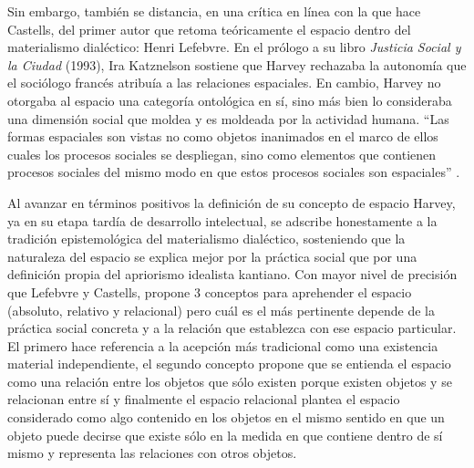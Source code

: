 Sin embargo, también se distancia, en una crítica en línea con la que hace Castells, del primer autor que retoma teóricamente el espacio dentro del materialismo dialéctico: Henri Lefebvre. En el prólogo a su libro \textit{Justicia Social y la Ciudad} (1993), Ira Katznelson sostiene que Harvey rechazaba la autonomía que el sociólogo francés atribuía a las relaciones espaciales. En cambio, Harvey no otorgaba al espacio una categoría ontológica en sí, sino más bien lo consideraba una dimensión social que moldea y es moldeada por la actividad humana. “Las formas espaciales son vistas no como objetos inanimados en el marco de ellos cuales los procesos sociales se despliegan, sino como elementos que contienen procesos sociales del mismo modo en que estos procesos sociales son espaciales” \cite[p.~3]{harvey}.

Al avanzar en términos positivos la definición de su concepto de espacio Harvey, ya en su etapa tardía de desarrollo intelectual, se adscribe honestamente a la tradición epistemológica del materialismo dialéctico, sosteniendo que la naturaleza del espacio se explica mejor por la práctica social que por una definición propia del apriorismo idealista kantiano. Con mayor nivel de precisión que Lefebvre y Castells, propone 3 conceptos para aprehender el espacio (absoluto, relativo y relacional) pero cuál es el más pertinente depende de la práctica social concreta y a la relación que establezca con ese espacio particular. El primero hace referencia a la acepción más tradicional como una existencia material independiente, el segundo concepto propone que se entienda el espacio como una relación entre los objetos que sólo existen porque existen objetos y se relacionan entre sí y finalmente el espacio relacional plantea el espacio considerado como algo contenido en los objetos en el mismo sentido en que un objeto puede decirse que existe sólo en la medida en que contiene dentro de sí mismo y representa las relaciones con otros objetos. 

